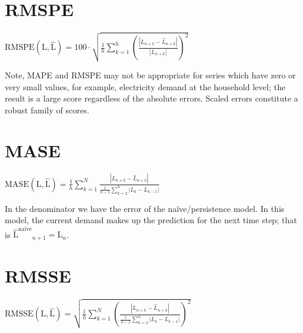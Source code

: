\section{RMSPE}\label{rmspe}
\begin{definition}
    $\mathrm{RMSPE}(\mathrm{L},\mathrm{\hat{L}})=100\cdot\sqrt{\frac{1}{h}\sum\limits_{k=1}^{h} \left(\frac{|L_{n+k}-\hat{L}_{n+k}|}{|L_{n+k}|}\right)^2}$
\end{definition}
Note, MAPE and RMSPE may not be appropriate for series which have zero or very small values, for example, electricity demand at the household level; the result is a large score regardless of the absolute errors.
Scaled errors constitute a robust family of scores.
\section{MASE}\label{mase}
\begin{definition}
    $\mathrm{MASE}(\mathrm{L},\mathrm{\hat{L}})=\frac{1}{h}\sum\limits_{k=1}^N\frac{|L_{n+k}-\hat{L}_{n+k}|}{\frac{1}{h-1}\sum\limits_{k=2}^{h}|L_{k}-L_{k-1}|}$
\end{definition}
In the denominator we have the error of the naïve/persistence model. 
In this model, the current demand makes up the prediction for the next time step; that is $\mathrm{\hat{L}^{\mathrm{naive}}}_{n+1}=\mathrm{L}_{n}$.
\section{RMSSE}\label{rmsse}
\begin{definition}
    $\mathrm{RMSSE}(\mathrm{L},\mathrm{\hat{L}})=\sqrt{\frac{1}{h}\sum\limits_{k=1}^N\left(\frac{|L_{n+k}-\hat{L}_{n+k}|}{\frac{1}{h-1}\sum\limits_{k=2}^{h}|L_{k}-L_{k-1}|}\right)^2}$
\end{definition}


